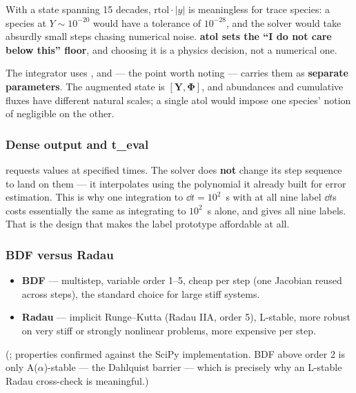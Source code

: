 With a state spanning 15 decades, $\mathrm{rtol}\cdot|y|$ is meaningless for
trace species: a species at $Y \sim 10^{-20}$ would have a tolerance of
$10^{-28}$, and the solver would take absurdly small steps chasing numerical
noise. \textbf{atol sets the ``I do not care below this'' floor}, and choosing it
is a physics decision, not a numerical one.

The integrator uses , and --- the point worth
noting --- carries them as \textbf{separate parameters}. The augmented state is
$[\mathbf{Y}, \boldsymbol{\Phi}]$, and abundances and cumulative fluxes have
different natural scales; a single atol would impose one species' notion of
negligible on the other.

\subsubsection{Dense output and t\_eval}
\label{sec:denseoutput}

 requests values at specified times. The solver does \textbf{not}
change its step sequence to land on them --- it interpolates using the
polynomial it already built for error estimation. This is why one integration to
$\dd t = 10^{2}$~s with  at all nine label $\dd t$s costs
essentially the same as integrating to $10^{2}$~s alone, and gives all nine
labels. That is the design that makes the label prototype affordable at all.

\subsubsection{BDF versus Radau}
\label{sec:bdfradau}

\begin{itemize}
\item \textbf{BDF} --- multistep, variable order 1--5, cheap per step (one
      Jacobian reused across steps), the standard choice for large stiff
      systems.
\item \textbf{Radau} --- implicit Runge--Kutta (Radau IIA, order 5), L-stable,
      more robust on very stiff or strongly nonlinear problems, more expensive
      per step.
\end{itemize}

(\citealt{hairer1996}; properties confirmed against the SciPy implementation.
BDF above order 2 is only A($\alpha$)-stable --- the Dahlquist barrier --- which
is precisely why an L-stable Radau cross-check is meaningful.)

